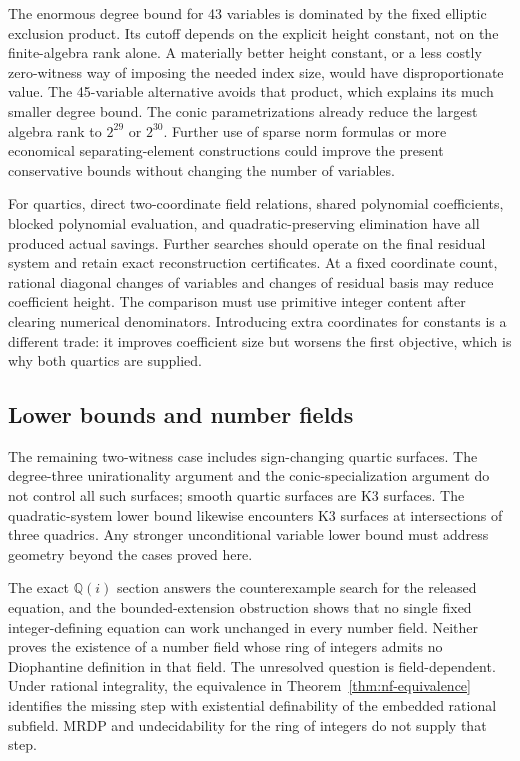 \documentclass[11pt]{article}
\theoremstyle{definition}
\newcommand{\Q}{\mathbb Q}
\begin{document}
The enormous degree bound for 43 variables is dominated by the fixed
elliptic exclusion product. Its cutoff depends on the explicit height
constant, not on the finite-algebra rank alone. A materially better
height constant, or a less costly zero-witness way of imposing the needed
index size, would have disproportionate value. The 45-variable alternative
avoids that product, which explains its much smaller degree bound.
The conic parametrizations already reduce the largest algebra rank to
$2^{29}$ or $2^{30}$. Further use of sparse norm formulas or more economical
separating-element constructions could improve the present conservative
bounds without changing the number of variables.

For quartics, direct two-coordinate field relations, shared polynomial
coefficients, blocked polynomial evaluation, and quadratic-preserving
elimination have all produced actual savings. Further searches should
operate on the final residual system and retain exact reconstruction
certificates. At a fixed coordinate count, rational diagonal changes of
variables and changes of residual basis may reduce coefficient height.
The comparison must use primitive integer content after clearing
numerical denominators. Introducing extra coordinates for constants is a
different trade: it improves coefficient size but worsens the first
objective, which is why both quartics are supplied.

\subsection{Lower bounds and number fields}

The remaining two-witness case includes sign-changing quartic surfaces.
The degree-three unirationality argument and the conic-specialization
argument do not control all such surfaces; smooth quartic surfaces are
K3 surfaces. The quadratic-system lower bound likewise encounters K3
surfaces at intersections of three quadrics. Any stronger unconditional
variable lower bound must address geometry beyond the cases proved here.

The exact $\Q(i)$ section answers the counterexample search for the
released equation, and the bounded-extension obstruction shows that no
single fixed integer-defining equation can work unchanged in every number
field. Neither proves the existence of a number field whose ring of
integers admits no Diophantine definition in that field. The unresolved
question is field-dependent. Under rational integrality, the equivalence
in Theorem~\ref{thm:nf-equivalence} identifies the missing step with
existential definability of the embedded rational subfield. MRDP and
undecidability for the ring of integers do not supply that step.
\end{document}
